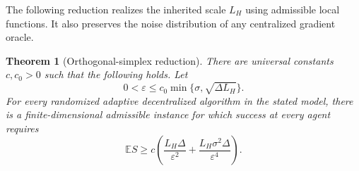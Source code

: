 \documentclass[11pt,a4paper]{article}
\newcommand{\E}{\mathbb{E}}
\newcommand{\eps}{\varepsilon}
\newtheorem{theorem}{Theorem}[section]
\theoremstyle{remark}
\begin{document}
The following reduction realizes the inherited scale $L_H$ using admissible
local functions. It also preserves the noise distribution of any centralized
gradient oracle.

\begin{theorem}[Orthogonal-simplex reduction]
\label{thm:sample-lower}
There are universal constants $c,c_0>0$ such that the following holds.  Let
\[
 0<\eps\le c_0\min\{\sigma,\sqrt{\Delta L_H}\}.
\]
For every randomized adaptive decentralized algorithm in the stated model,
there is a finite-dimensional admissible instance for which success at every
agent requires
\begin{equation}
 \E S\ge c\left(
      \frac{L_H\Delta}{\eps^2}
      +\frac{L_H\sigma^2\Delta}{\eps^4}
      \right).
 \label{eq:sample-lower}
\end{equation}
\end{theorem}
\end{document}
